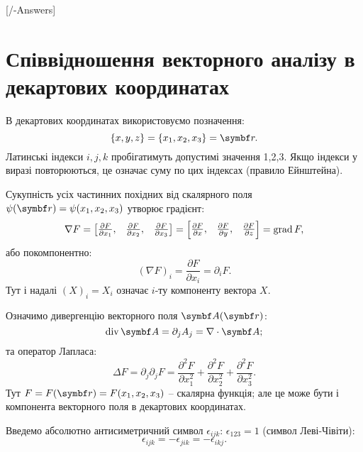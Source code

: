 
[\currfilebase/\currfilebase-Answers]
\chapter{Співвідношення векторного аналізу в декартових координатах }\label{\currfilebase}

\begin{Theory}
В декартових координатах використовуємо позначення:
\[
\{x, y, z\} = \{x_1, x_2, x_3\} =  \vect{r}.
\]
Латинські індекси \(i, j, k\) пробігатимуть допустимі значення 1,2,3. Якщо індекси у виразі повторюються, це означає суму по цих індексах (правило Ейнштейна).

Сукупність усіх частинних похідних від скалярного поля \(\psi( \vect{r}) = \psi(x_1, x_2, x_3)\) утворює градієнт:
\[
\nabla F =
\begin{bmatrix}
\frac{\partial F}{\partial x_1}, & \frac{\partial F}{\partial x_2}, & \frac{\partial F}{\partial x_3}
\end{bmatrix}
=
\begin{bmatrix}
\frac{\partial F}{\partial x}, & \frac{\partial F}{\partial y}, & \frac{\partial F}{\partial z}
\end{bmatrix}
= \operatorname{grad}{F},
\]
або покомпонентно:
\[
(\nabla F)_i = \frac{\partial F}{\partial x_i} = \partial_i F.
\]
Тут і надалі \((X)_i = X_i\) означає \(i\)-ту компоненту вектора \(X\).

Означимо дивергенцію векторного поля \( \vect{A}( \vect{r})\):
\[
\Div\vect{A} = \partial_j A_j = \nabla \cdot  \vect{A};
\]
та оператор Лапласа:
\[
\Delta F = \partial_j \partial_j F = \frac{\partial^2 F}{\partial x_1^2} + \frac{\partial^2 F}{\partial x_2^2} + \frac{\partial^2 F}{\partial x_3^2}.
\]
Тут \(F = F( \vect{r}) = F(x_1, x_2, x_3)\) -- скалярна функція; але це може бути і компонента векторного поля в декартових координатах.

Введемо абсолютно антисиметричний символ \(\epsilon_{ijk}\): \(\epsilon_{123} = 1\) (символ Леві-Чівіти):
\[
\epsilon_{ijk} = -\epsilon_{jik} = -\epsilon_{ikj}.
\]


\end{Theory}
